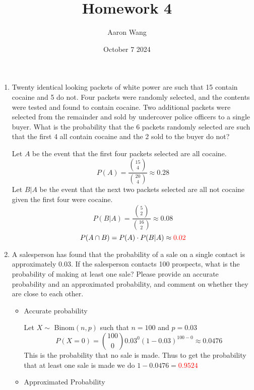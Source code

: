 \documentclass{article}
\title{Homework 4}
\author{Aaron Wang}
\date{October 7 2024}
\newcommand{\intersect}{\cap}
\begin{document}
\maketitle
    \begin{enumerate}
        \item Twenty identical looking packets of white power are such that 15 contain cocaine and 5 do not. Four packets were randomly selected, and the contents were tested and found to contain cocaine. Two additional packets were selected from the remainder and sold by undercover police officers to a single buyer. What is the probability that the 6 packets randomly selected are such that the first 4 all contain cocaine and the 2 sold to the buyer do not?
        
        
        Let $A$ be the event that the first four packets selected are all cocaine.
        \begin{equation*}
            P(A)=\frac{\binom{15}{4}}{\binom{20}{4}}\approx 0.28
        \end{equation*}
        Let $B|A$ be the event that the next two packets selected are all not cocaine given the first four were cocaine.
        \begin{equation*}
            P(B|A)=\frac{\binom{5}{2}}{\binom{16}{2}}\approx 0.08
        \end{equation*}
        \begin{equation*}
            P(A \intersect B)=P(A) \cdot P(B|A)\approx \textcolor{red}{0.02}
        \end{equation*}
\pagebreak
        \item A salesperson has found that the probability of a sale on a single contact is approximately 0.03. If the salesperson contacts 100 prospects, what is the probability of making at least one sale? Please provide an accurate probability and an approximated probability, and comment on whether they are close to each other.
        \begin{itemize}
            \item Accurate probability

            Let $X \sim$ Binom$(n,p)$ such that $n=100$ and $p=0.03$
            \begin{equation*}
                P(X=0)=\binom{100}{0}0.03^0(1-0.03)^{100-0}\approx 0.0476
            \end{equation*}
            This is the probability that no sale is made.
            Thus to get the probability that at least one sale is made we do $1-0.0476=$\textcolor{red}{$0.9524$}
            \item Approximated Probability



\end{itemize}
\end{enumerate}
\end{document}
